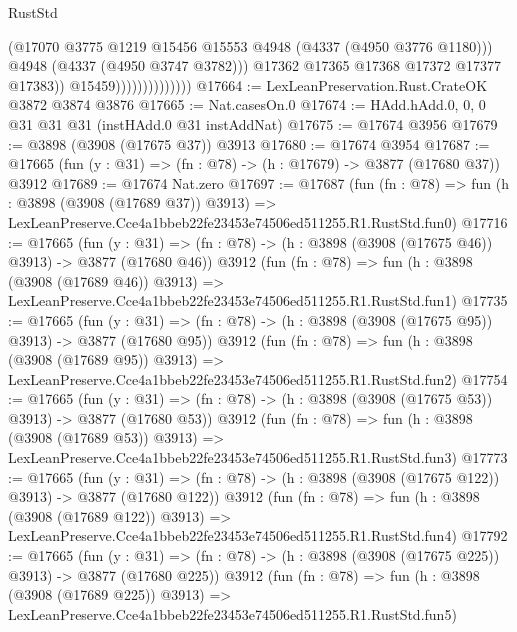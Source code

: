 \begin{lexlean}{RustStd}
\begin{coremodule}
                                      (@17070
                                        @3775
                                        @1219
                                        @15456
                                        @15553
                                        @4948
                                        (@4337 (@4950 @3776 @1180)))
                                      @4948
                                      (@4337 (@4950 @3747 @3782)))
                                    @17362
                                    @17365
                                    @17368
                                    @17372
                                    @17377
                                    @17383))
                                @15459))))))))))))))
@17664 := LexLeanPreservation.Rust.CrateOK @3872 @3874 @3876
@17665 := Nat.casesOn.{0}
@17674 := HAdd.hAdd.{0, 0, 0} @31 @31 @31 (instHAdd.{0} @31 instAddNat)
@17675 := @17674 @3956
@17679 := @3898 (@3908 (@17675 @37)) @3913
@17680 := @17674 @3954
@17687 := @17665 (fun (y : @31) => (fn : @78) -> (h : @17679) -> @3877 (@17680 @37)) @3912
@17689 := @17674 Nat.zero
@17697 := @17687
    (fun (fn : @78) =>
    fun (h : @3898 (@3908 (@17689 @37)) @3913) =>
    LexLeanPreserve.Cce4a1bbeb22fe23453e74506ed511255.R1.RustStd.fun0)
@17716 := @17665
    (fun (y : @31) => (fn : @78) -> (h : @3898 (@3908 (@17675 @46)) @3913) -> @3877 (@17680 @46))
    @3912
    (fun (fn : @78) =>
    fun (h : @3898 (@3908 (@17689 @46)) @3913) =>
    LexLeanPreserve.Cce4a1bbeb22fe23453e74506ed511255.R1.RustStd.fun1)
@17735 := @17665
    (fun (y : @31) => (fn : @78) -> (h : @3898 (@3908 (@17675 @95)) @3913) -> @3877 (@17680 @95))
    @3912
    (fun (fn : @78) =>
    fun (h : @3898 (@3908 (@17689 @95)) @3913) =>
    LexLeanPreserve.Cce4a1bbeb22fe23453e74506ed511255.R1.RustStd.fun2)
@17754 := @17665
    (fun (y : @31) => (fn : @78) -> (h : @3898 (@3908 (@17675 @53)) @3913) -> @3877 (@17680 @53))
    @3912
    (fun (fn : @78) =>
    fun (h : @3898 (@3908 (@17689 @53)) @3913) =>
    LexLeanPreserve.Cce4a1bbeb22fe23453e74506ed511255.R1.RustStd.fun3)
@17773 := @17665
    (fun (y : @31) => (fn : @78) -> (h : @3898 (@3908 (@17675 @122)) @3913) -> @3877 (@17680 @122))
    @3912
    (fun (fn : @78) =>
    fun (h : @3898 (@3908 (@17689 @122)) @3913) =>
    LexLeanPreserve.Cce4a1bbeb22fe23453e74506ed511255.R1.RustStd.fun4)
@17792 := @17665
    (fun (y : @31) => (fn : @78) -> (h : @3898 (@3908 (@17675 @225)) @3913) -> @3877 (@17680 @225))
    @3912
    (fun (fn : @78) =>
    fun (h : @3898 (@3908 (@17689 @225)) @3913) =>
    LexLeanPreserve.Cce4a1bbeb22fe23453e74506ed511255.R1.RustStd.fun5)

\end{coremodule}
\end{lexlean}
